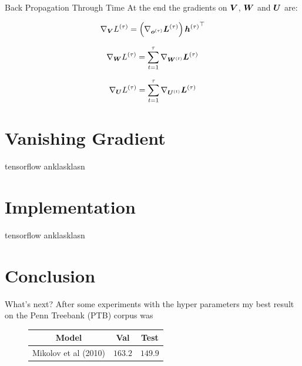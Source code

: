 \documentclass[10pt]{beamer}
\begin{document}
\begin{frame}{Back Propagation Through Time}
At the end the gradients on $\bm{V}$, $\bm{W}$ and $\bm{U}$ are:
\vspace{0.3cm}
\Large{
\begin{equation*}
\nabla_{\bm{V}} {L^{(\tau)}} = \left({\nabla_{\bm{o}^{(\tau)}} {\bm{L}^{(\tau)}}}\right){\bm{h}^{(\tau)}}^{\top} 
\end{equation*}


\begin{equation*}
\nabla_{\bm{W}} {L^{(\tau)}} = \sum_{t=1}^{\tau}\nabla_{\bm{W}^{(t)}} {\bm{L}^{(\tau)}}
\end{equation*}

\begin{equation*}
\nabla_{\bm{U}} {L^{(\tau)}} = \sum_{t=1}^{\tau}\nabla_{\bm{U}^{(t)}} {\bm{L}^{(\tau)}}
\end{equation*}
}
\end{frame}

\section{Vanishing Gradient}

\begin{frame}{tensorflow}
anklasklasn
\end{frame}

\section{Implementation}

\begin{frame}{tensorflow}
anklasklasn
\end{frame}

\section{Conclusion}

\begin{frame}{What's next?}
After some experiments with the hyper parameters my best result on the \alert{Penn Treebank (PTB)} corpus was

\vspace{0.5cm}

\begin{figure}
\begin{center}
\begin{tabular}{|c|c|c|}
\hline
\cellcolor{blue!10}Model & \cellcolor{blue!10}Val & \cellcolor{blue!10}Test  \\ \hline
Mikolov et al (2010) & $163.2$  & $149.9$ \\ \hline
\end{tabular}
\end{center}
\end{figure}
\end{frame}
\end{document}
